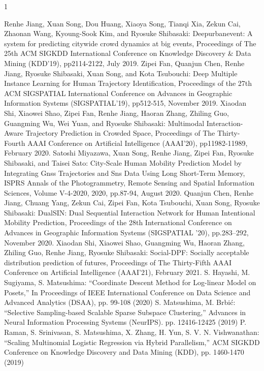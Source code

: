 \begin{査読付}{1}

Renhe Jiang, Xuan Song, Dou Huang, Xiaoya Song, Tianqi Xia, Zekun Cai, Zhaonan Wang, Kyoung-Sook Kim, and Ryosuke Shibasaki:
Deepurbanevent: A system for predicting citywide crowd dynamics at big events, Proceedings of The 25th ACM SIGKDD International Conference on Knowledge Discovery \& Data Mining (KDD'19), pp2114-2122, July 2019.
Zipei Fan, Quanjun Chen, Renhe Jiang, Ryosuke Shibasaki, Xuan Song, and Kota Tsubouchi:
Deep Multiple Instance Learning for Human Trajectory Identification, Proceedings of the 27th ACM SIGSPATIAL International Conference on Advances in Geographic Information Systems (SIGSPATIAL'19), pp512-515, November 2019.
Xiaodan Shi, Xiaowei Shao, Zipei Fan, Renhe Jiang, Haoran Zhang, Zhiling Guo, Guangming Wu, Wei Yuan, and Ryosuke Shibasaki:
Multimodal Interaction-Aware Trajectory Prediction in Crowded Space, Proceedings of The Thirty-Fourth AAAI Conference on Artificial Intelligence (AAAI'20), pp11982-11989, February 2020.
Satoshi Miyazawa, Xuan Song, Renhe Jiang, Zipei Fan, Ryosuke Shibasaki, and Taisei Sato:
City-Scale Human Mobility Prediction Model by Integrating Gnss Trajectories and Sns Data Using Long Short-Term Memory, ISPRS Annals of the Photogrammetry, Remote Sensing and Spatial Information Sciences, Volume V-4-2020, 2020, pp.87-94, August 2020.
Quanjun Chen, Renhe Jiang, Chuang Yang, Zekun Cai, Zipei Fan, Kota Tsubouchi, Xuan Song, Ryosuke Shibasaki: 
DualSIN: Dual Sequential Interaction Network for Human Intentional Mobility Prediction, Proceedings of the 28th International Conference on Advances in Geographic Information Systems (SIGSPATIAL '20), pp.283–292, November 2020.
Xiaodan Shi, Xiaowei Shao, Guangming Wu, Haoran Zhang, Zhiling Guo, Renhe Jiang, Ryosuke Shibasaki: 
Social-DPF: Socially acceptable distribution prediction of futures, Proceedings of The Thirty-Fifth AAAI Conference on Artificial Intelligence (AAAI'21), February 2021.
S. Hayashi, M. Sugiyama, S. Matsushima: “Coordinate Descent Method for Log-linear Model on Posets,”  In Proceedings of IEEE International Conference on Data Science and Advanced Analytics (DSAA), pp. 99-108 (2020)
S. Matsushima, M. Brbić: “Selective Sampling-based Scalable Sparse Subspace Clustering,” Advances in Neural Information Processing Systems (NeurIPS). pp. 12416-12425 (2019)
P. Raman, S. Srinivasan, S. Matsushima, X. Zhang, H. Yun, S. V. N. Vishwanathan: “Scaling Multinomial Logistic Regression via Hybrid Parallelism,” ACM SIGKDD Conference on Knowledge Discovery and Data Mining (KDD), pp. 1460-1470 (2019)


\end{査読付}
